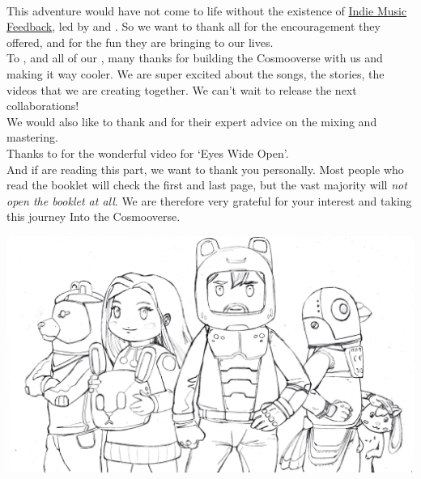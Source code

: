 
\phantom{*}\\

This adventure would have not come to life without the existence of \href{https://indiemusicfeedback.com}{Indie Music Feedback}, led by  and . So we want to thank all  for the encouragement they offered, and for the fun they are bringing to our lives.\\

To ,  and all of our , many thanks for building the Cosmooverse with us and making it way cooler. We are super excited about the songs, the stories, the videos that we are creating together. We can't wait to release the next collaborations!\\

We would also like to thank  and  for their expert advice on the mixing and mastering.\\

Thanks to  for the wonderful video for `Eyes Wide Open'.\\

And if  are reading this part, we want to thank you personally. Most people who read the booklet will check the first and last page, but the vast majority will \emph{not open the booklet at all}. We are therefore very grateful for your interest and taking this journey Into the Cosmooverse.\\


\clearpage



\vspace*{\fill}
\includegraphics[width=.7\paperwidth]{Assets/cosmoose_cover_drawz}

